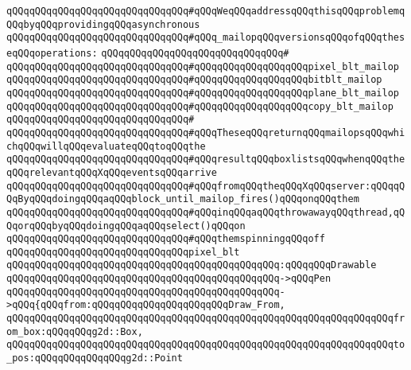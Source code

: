 \verb|qQQqqQQqqQQqqQQqqQQqqQQqqQQqqQQq#qQQqWeqQQqaddressqQQqthisqQQqproblemqQQqbyqQQqprovidingqQQqasynchronous|\newline
\verb|qQQqqQQqqQQqqQQqqQQqqQQqqQQqqQQq#qQQq_mailopqQQqversionsqQQqofqQQqtheseqQQqoperations:|\newline
\verb|qQQqqQQqqQQqqQQqqQQqqQQqqQQqqQQq#|\newline
\verb|qQQqqQQqqQQqqQQqqQQqqQQqqQQqqQQq#qQQqqQQqqQQqqQQqqQQqpixel_blt_mailop|\newline
\verb|qQQqqQQqqQQqqQQqqQQqqQQqqQQqqQQq#qQQqqQQqqQQqqQQqqQQqbitblt_mailop|\newline
\verb|qQQqqQQqqQQqqQQqqQQqqQQqqQQqqQQq#qQQqqQQqqQQqqQQqqQQqplane_blt_mailop|\newline
\verb|qQQqqQQqqQQqqQQqqQQqqQQqqQQqqQQq#qQQqqQQqqQQqqQQqqQQqcopy_blt_mailop|\newline
\verb|qQQqqQQqqQQqqQQqqQQqqQQqqQQqqQQq#|\newline
\verb|qQQqqQQqqQQqqQQqqQQqqQQqqQQqqQQq#qQQqTheseqQQqreturnqQQqmailopsqQQqwhichqQQqwillqQQqevaluateqQQqtoqQQqthe|\newline
\verb|qQQqqQQqqQQqqQQqqQQqqQQqqQQqqQQq#qQQqresultqQQqboxlistsqQQqwhenqQQqtheqQQqrelevantqQQqXqQQqeventsqQQqarrive|\newline
\verb|qQQqqQQqqQQqqQQqqQQqqQQqqQQqqQQq#qQQqfromqQQqtheqQQqXqQQqserver:qQQqqQQqByqQQqdoingqQQqaqQQqblock_until_mailop_fires()qQQqonqQQqthem|\newline
\verb|qQQqqQQqqQQqqQQqqQQqqQQqqQQqqQQq#qQQqinqQQqaqQQqthrowawayqQQqthread,qQQqorqQQqbyqQQqdoingqQQqaqQQqselect()qQQqon|\newline
\verb|qQQqqQQqqQQqqQQqqQQqqQQqqQQqqQQq#qQQqthemspinningqQQqoff|\newline
\newline
\verb|qQQqqQQqqQQqqQQqqQQqqQQqqQQqqQQqpixel_blt|\newline
\verb|qQQqqQQqqQQqqQQqqQQqqQQqqQQqqQQqqQQqqQQqqQQqqQQq:qQQqqQQqDrawable|\newline
\verb|qQQqqQQqqQQqqQQqqQQqqQQqqQQqqQQqqQQqqQQqqQQqqQQq->qQQqPen|\newline
\verb|qQQqqQQqqQQqqQQqqQQqqQQqqQQqqQQqqQQqqQQqqQQqqQQq->qQQq{qQQqfrom:qQQqqQQqqQQqqQQqqQQqqQQqDraw_From,|\newline
\verb|qQQqqQQqqQQqqQQqqQQqqQQqqQQqqQQqqQQqqQQqqQQqqQQqqQQqqQQqqQQqqQQqqQQqfrom_box:qQQqqQQqg2d::Box,|\newline
\verb|qQQqqQQqqQQqqQQqqQQqqQQqqQQqqQQqqQQqqQQqqQQqqQQqqQQqqQQqqQQqqQQqqQQqto_pos:qQQqqQQqqQQqqQQqg2d::Point|\newline
